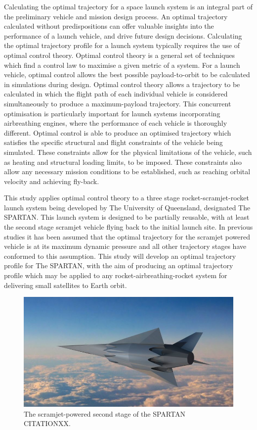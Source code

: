   Calculating the optimal trajectory for a space launch system is an integral part of the preliminary vehicle and mission design process. An optimal trajectory calculated without predispositions can offer valuable insights into the performance of a launch vehicle, and drive future design decisions. Calculating the optimal trajectory profile for a launch system typically requires the use of optimal control theory. Optimal control theory is a general set of techniques which find a control law to maximise a given metric of a system. For a launch vehicle, optimal control allows the best possible payload-to-orbit to be calculated in simulations during design. 
Optimal control theory allows a trajectory to be calculated in which the flight path of each individual vehicle is considered simultaneously to produce a maximum-payload trajectory. 
This concurrent optimisation is particularly important for launch systems incorporating airbreathing engines, where the performance of each vehicle is thoroughly different. 
Optimal control is able to produce an optimised trajectory which satisfies the specific structural and flight constraints of the vehicle being simulated. These constraints allow for the physical limitations of the vehicle, such as heating and structural loading limits, to be imposed. These constraints also allow any necessary mission conditions to be established, such as reaching orbital velocity and achieving fly-back. 
  
  
  	   This study applies optimal control theory to a three stage rocket-scramjet-rocket launch system being developed by The University of Queensland, designated The SPARTAN. This launch system is designed to be partially reusable, with at least the second stage scramjet vehicle flying back to the initial launch site. 
  	   In previous studies it has been assumed that the optimal trajectory for the scramjet powered vehicle is at its
  	   maximum dynamic pressure and all other trajectory stages have conformed to this assumption.
  	   This study will develop an optimal trajectory profile for The SPARTAN, with the aim of producing an optimal
  	   trajectory profile which may be applied to any rocket-airbreathing-rocket system for delivering small
  	   satellites to Earth orbit. 
  	   
  	  	\begin{figure}[ht]
  	  		\centering
  	  		\includegraphics[width=0.7\linewidth]{figures/1_introduction/project-spartan}
  	  		\caption{The scramjet-powered second stage of the SPARTAN CITATIONXX.}
  	  		\label{fig:project-spartan}
  	  	\end{figure}
  	  	

